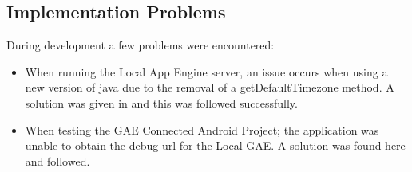 \subsection{Implementation Problems}
During development a few problems were encountered:
\begin{itemize}
	\item{When running the Local App Engine server, an issue occurs when using a new version of java due to the removal of a getDefaultTimezone method. A solution was given in \cite{solution} and this was followed successfully.}
	\item{When testing the GAE Connected Android Project; the application was unable to obtain the debug url for the Local GAE. A solution was found here \cite{solution2} and followed.}
\end{itemize}
